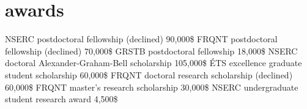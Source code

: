\documentclass[print]{friggeri-cv}
\begin{document}
\begin{entrylist}
\end{entrylist}

\section{awards}
\begin{entrylist}
   {{\small NSERC} postdoctoral fellowship (declined)} {90,000\$} {\vspace{-3mm}}
   {{\small FRQNT} postdoctoral fellowship (declined)} {70,000\$} {\vspace{-3mm}}
   {{\small GRSTB} postdoctoral fellowship} {18,000\$} {\vspace{-3mm}}
   {{\small NSERC} doctoral Alexander-Graham-Bell scholarship} {105,000\$} {\vspace{-3mm}}
   {{\small ÉTS} excellence graduate student scholarship} {60,000\$} {\vspace{-3mm}}
   {{\small FRQNT} doctoral research scholarship (declined)} {60,000\$} {\vspace{-3mm}}
   {{\small FRQNT} master's research scholarship} {30,000\$} {\vspace{-3mm}}
   {{\small NSERC} undergraduate student research award} {4,500\$} {\vspace{-3mm}}
 \end{entrylist}
\vspace{2mm}
\end{document}
